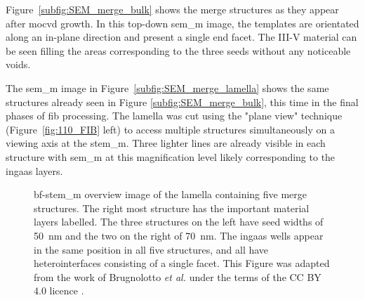 Figure~\ref{subfig:SEM_merge_bulk} shows the merge structures as they appear after \acs{mocvd} growth. In this top-down \acs{sem_m} image, the templates are orientated along an in-plane  direction and present a single  end facet. The III-V material can be seen filling the areas corresponding to the three seeds without any noticeable voids. 

The \acs{sem_m} image in Figure~\ref{subfig:SEM_merge_lamella} shows the same structures already seen in Figure \ref{subfig:SEM_merge_bulk}, this time in the final phases of \acs{fib} processing. The lamella was cut using the "plane view" technique (Figure~\ref{fig:110_FIB} left) to access multiple structures simultaneously on a  viewing axis at the \acs{stem_m}. Three lighter lines are already visible in each structure with \acs{sem_m} at this magnification level likely corresponding to the \acs{ingaas} layers.

\begin{figure}
    \centering
    \caption[\acs{bf}-\acs{stem_m} overview image of the lamella containing five merge structures.]{\acs{bf}-\acs{stem_m} overview image of the lamella containing five merge structures. The right most structure has the important material layers labelled. The three structures on the left have seed widths of \qty{50}{\nano\metre} and the two on the right of \qty{70}{\nano\metre}. The \acs{ingaas} wells appear in the same position in all five structures, and all have heterointerfaces consisting of a single  facet. This Figure was adapted from the work of Brugnolotto \textit{et al.} \cite{Brugnolotto2023_2} under the terms of the CC BY 4.0 licence \cite{CCBY40}.}
    \label{fig:merge_ov}
\end{figure}

